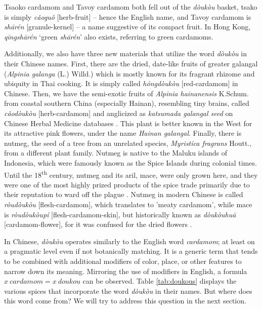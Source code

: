 \documentclass[12pt]{article}
\newcommand{\tc}[1]{\traditionalchinesefont{#1}\rmfamily}
\begin{document}
Tsaoko cardamom and Tavoy cardamom both fell out of the \textit{dòukòu} basket, tsako is simply \textit{cǎoguǒ} [herb-fruit] -- hence the English name, and Tavoy cardamom is \textit{shārén} [granule-kernel] -- a name suggestive of its compact fruit. In Hong Kong, \tc{青砂仁} \textit{qīngshārén} `green \textit{shārén}' also exists, referring to green cardamoms.


Additionally, we also have three new materials that utilize the word \textit{dòukòu} in their Chinese names. First, there are the dried, date-like fruits of greater galangal (\textit{Alpinia galanga} (L.) Willd.) which is mostly known for its fragrant rhizome and ubiquity in Thai cooking. It is simply called \textit{hóngdòukòu} [red-cardamom] in Chinese. Then, we have the semi-exotic fruits of \textit{Alpinia hainanensis} K.Schum. from coastal southern China (especially Hainan), resembling tiny brains, called \textit{cǎodòukòu} [herb-cardamom] and anglicized as \textit{katsumada galangal seed} on Chinese Herbal Medicine databases \parencite[cf.][]{polyu_2024_chinese}. This plant is better known in the West for its attractive pink flowers, under the name \textit{Hainan galangal}.  Finally, there is nutmeg, the seed of a tree from an unrelated species, \textit{Myristica fragrans} Houtt., from a different plant family. Nutmeg is native to the Maluku islands of Indonesia, which were famously known as the Spice Islands during colonial times. Until the 18\textsuperscript{th} century, nutmeg and its aril, mace, were only grown here, and they were one of the most highly prized products of the spice trade primarily due to their reputation to ward off the plague \parencite[see][]{milton_1999_nathaniel}. Nutmeg in modern Chinese is called \textit{ròudòukòu} [flesh-cardamom], which translates to 'meaty cardamom', while mace is \textit{ròudòukòupí} [flesh-cardamom-skin], but historically known as \tc{豆蔻花} \textit{dòukòuhuā} [cardamom-flower], for it was confused for the dried flowers \parencite{hirth_1911_chau}.


In Chinese, \textit{dòukòu} operates similarly to the English word \textit{cardamom}; at least on a pragmatic level even if not botanically matching. It is a generic term that tends to be combined with additional modifiers of color, place, or other features to narrow down its meaning. Mirroring the use of modifiers in English, a formula $x~cardamom = x~doukou$ can be observed. Table \ref{tab:doukous} displays the various spices that incorporate the word \textit{dòukòu} in their names. But where does this word come from? We will try to address this question in the next section.
\end{document}
